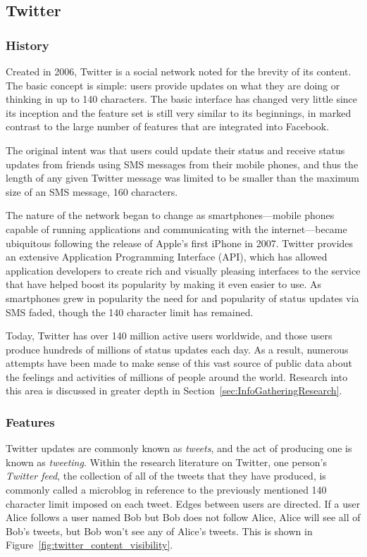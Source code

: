 \subsection{Twitter}

\subsubsection{History}

Created in 2006, Twitter is a social network noted for the brevity of its content. The basic concept is simple: users provide updates on what they are doing or thinking in up to 140 characters. The basic interface has changed very little since its inception and the feature set is still very similar to its beginnings, in marked contrast to the large number of features that are integrated into Facebook.

The original intent was that users could update their status and receive status updates from friends using SMS messages from their mobile phones, and thus the length of any given Twitter message was limited to be smaller than the maximum size of an SMS message, 160 characters.

The nature of the network began to change as smartphones---mobile phones capable of running applications and communicating with the internet---became ubiquitous following the release of Apple's first iPhone in 2007. Twitter provides an extensive Application Programming Interface (API), which has allowed application developers to create rich and visually pleasing interfaces to the service that have helped boost its popularity by making it even easier to use. As smartphones grew in popularity the need for and popularity of status updates via SMS faded, though the 140 character limit has remained.

Today, Twitter has over 140 million active users worldwide, and those users produce hundreds of millions of status updates each day. As a result, numerous attempts have been made to make sense of this vast source of public data about the feelings and activities of millions of people around the world. Research into this area is discussed in greater depth in Section~\ref{sec:InfoGatheringResearch}.

\subsubsection{Features}

Twitter updates are commonly known as \emph{tweets}, and the act of producing one is known as \emph{tweeting}. Within the research literature on Twitter, one person's \emph{Twitter feed}, the collection of all of the tweets that they have produced, is commonly called a microblog in reference to the previously mentioned 140 character limit imposed on each tweet. Edges between users are directed. If a user Alice follows a user named Bob but Bob does not follow Alice, Alice will see all of Bob's tweets, but Bob won't see any of Alice's tweets. This is shown in Figure~\ref{fig:twitter_content_visibility}.

